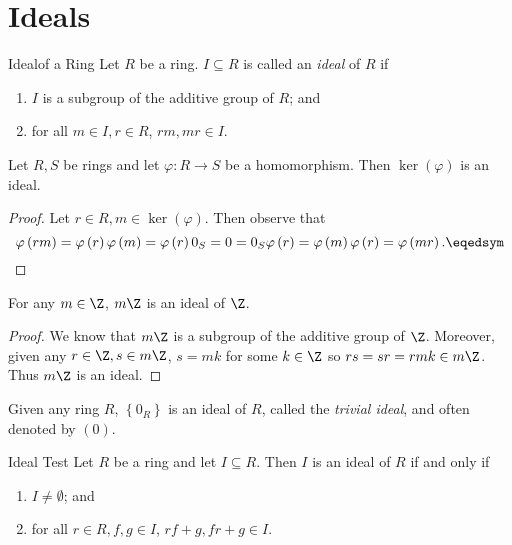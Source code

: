 \documentclass[pmath347]{subfiles}
\begin{document}

    \section{Ideals}

    \begin{definition}{Ideal}{of a Ring}
        Let $R$ be a ring. $I\subseteq R$ is called an \emph{ideal} of $R$ if
        \begin{enumerate}
            \item $I$ is a subgroup of the additive group of $R$; and
            \item for all $m\in I, r\in R$, $rm,mr\in I$.
        \end{enumerate}
    \end{definition}
    
    \begin{prop}{}
        Let $R,S$ be rings and let $\varphi:R\to S$ be a homomorphism. Then $\ker\left( \varphi \right)$ is an ideal.
    \end{prop}

    \begin{proof}
        Let $r\in R, m\in\ker\left( \varphi \right)$. Then observe that
        \begin{equation*}
            \varphi\left( rm \right) = \varphi\left( r \right) \varphi\left( m \right) = \varphi\left( r \right) 0_S = 0 = 0_S\varphi\left( r \right) = \varphi\left( m \right) \varphi\left( r \right) = \varphi\left( mr \right) . \eqedsym
        \end{equation*}
    \end{proof}

    \begin{prop}{}
        For any $m\in\Z$, $m\Z$ is an ideal of $\Z$.
    \end{prop}

    \begin{proof}
        We know that $m\Z$ is a subgroup of the additive group of $\Z$. Moreover, given any $r\in\Z, s\in m\Z$, $s=mk$ for some $k\in\Z$ so $rs = sr = rmk\in m\Z$. Thus $m\Z$ is an ideal.
    \end{proof}

    \np Given any ring $R$, $\left\lbrace 0_R \right\rbrace$ is an ideal of $R$, called the \emph{trivial ideal}, and often denoted by $\left( 0 \right)$.
    
    \begin{prop}{Ideal Test}
        Let $R$ be a ring and let $I\subseteq R$. Then $I$ is an ideal of $R$ if and only if
        \begin{enumerate}
            \item $I\neq\emptyset$; and
            \item for all $r\in R, f,g\in I$, $rf+g,fr+g\in I$.
        \end{enumerate}
    \end{prop}
\end{document}
